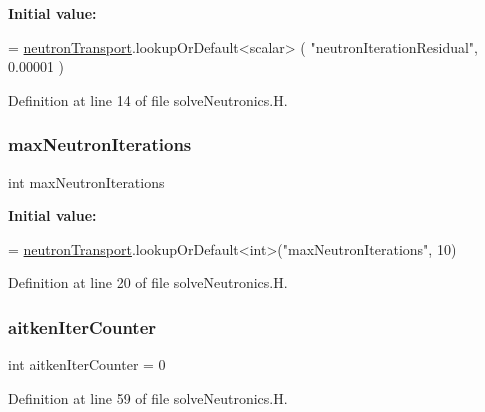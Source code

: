{\bfseries Initial value\+:}
\begin{DoxyCode}
=
    \hyperlink{solveNeutronics_8H_ac82f3800c6fe7f00c65fbf04d3c1050d}{neutronTransport}.lookupOrDefault<scalar>
    (
        \textcolor{stringliteral}{"neutronIterationResidual"},
        0.00001
    )
\end{DoxyCode}


Definition at line 14 of file solve\+Neutronics.\+H.

\mbox{\label{solveNeutronics_8H_aeeb27a033c3d21cdfe4cc47565bc21a2}} 
\subsubsection{\texorpdfstring{max\+Neutron\+Iterations}{maxNeutronIterations}}
{\footnotesize\ttfamily int max\+Neutron\+Iterations}

{\bfseries Initial value\+:}
\begin{DoxyCode}
=
    \hyperlink{solveNeutronics_8H_ac82f3800c6fe7f00c65fbf04d3c1050d}{neutronTransport}.lookupOrDefault<\textcolor{keywordtype}{int}>(\textcolor{stringliteral}{"maxNeutronIterations"}, 10)
\end{DoxyCode}


Definition at line 20 of file solve\+Neutronics.\+H.

\mbox{\label{solveNeutronics_8H_a99558413abb34d76245c07185d7117d4}} 
\subsubsection{\texorpdfstring{aitken\+Iter\+Counter}{aitkenIterCounter}}
{\footnotesize\ttfamily int aitken\+Iter\+Counter = 0}



Definition at line 59 of file solve\+Neutronics.\+H.

\mbox{\label{solveNeutronics_8H_a0a1c3011c74baf349d41384de3b18ee3}} 

